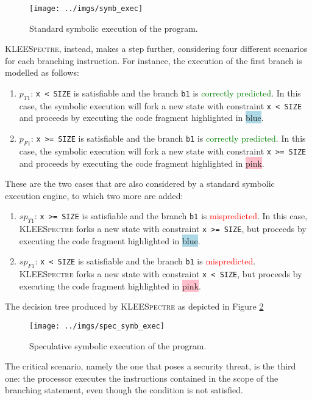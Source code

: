 \documentclass[12pt,a4paper]{book}
\theoremstyle{definition}
\begin{document}
	\begin{figure}
		\centering
		\texttt{[image: ../imgs/symb\_exec]}
		\caption{Standard symbolic execution of the program.}
		\label{fig:standars_symb_exec}
	\end{figure}
	\textsc{KLEESpectre}, instead, makes a step further, considering four different scenarios for each branching instruction. For instance, the execution of the first branch is modelled as follows: 
	\begin{enumerate}
		\item $p_{T1}$: \texttt{x < SIZE} is satisfiable and the branch \texttt{b1} is \textcolor{green}{correctly predicted}. In this case, the symbolic execution will fork a new state with constraint \texttt{x < SIZE} and proceeds by executing the code fragment highlighted in \colorbox{lightblue}{blue}.
		\item $p_{F1}$: \texttt{x >= SIZE} is satisfiable and the branch \texttt{b1} is \textcolor{green}{correctly predicted}. In this case, the symbolic execution will fork a new state with constraint \texttt{x >= SIZE} and proceeds by executing the code fragment highlighted in \colorbox{pink}{pink}.
	\end{enumerate}
	These are the two cases that are also considered by a standard symbolic execution engine, to which two more are added:
	\begin{enumerate}[resume]
		\item $sp_{T1}$: \texttt{x >= SIZE} is satisfiable and the branch \texttt{b1} is \textcolor{red}{mispredicted}. In this case, \textsc{KLEESpectre} forks a new state with constraint \texttt{x >= SIZE}, but proceeds by executing the code fragment highlighted in \colorbox{lightblue}{blue}.
		\item $sp_{F1}$: \texttt{x < SIZE} is satisfiable and the branch \texttt{b1} is \textcolor{red}{mispredicted}. \textsc{KLEESpectre} forks a new state with constraint \texttt{x < SIZE}, but proceeds by executing the code fragment highlighted in \colorbox{pink}{pink}.
	\end{enumerate}
	The decision tree produced by \textsc{KLEESpectre} as depicted in Figure \ref{fig:spec_symb_exec}
	
	\begin{figure}
		\centering
		\texttt{[image: ../imgs/spec\_symb\_exec]}
		\caption{Speculative symbolic execution of the program.}
		\label{fig:spec_symb_exec}
	\end{figure}
	
	The critical scenario, namely the one that poses a security threat, is the third one: the processor executes the instructions contained in the scope of the branching statement, even though the condition is not satisfied. 
	
\end{document}
